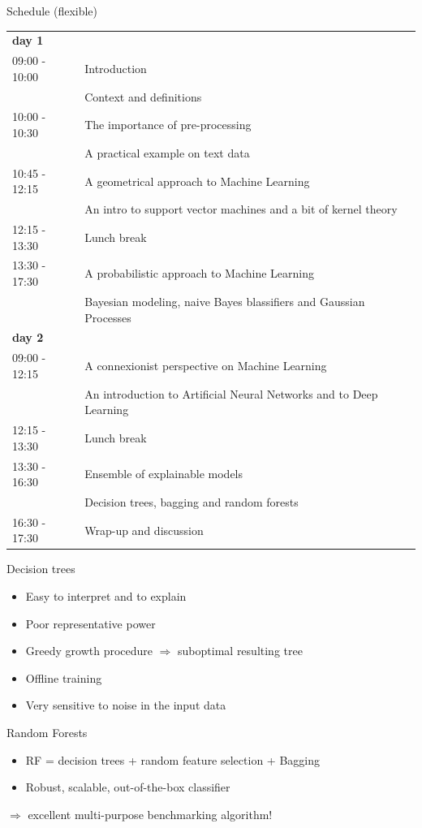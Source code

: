 \documentclass[10pt,a4paper,t,aspectratio=1610,dvipsnames]{beamer}
\begin{document}
\begin{frame}{Schedule (flexible)}
	\begin{tabular}{ll}
		\textbf{day 1} & \\
		09:00 - 10:00 & Introduction\\
		& {\footnotesize Context and definitions}\\
		10:00 - 10:30 & The importance of pre-processing\\
		& {\footnotesize A practical example on text data}\\
		10:45 - 12:15 & A geometrical approach to Machine Learning\\
		& {\footnotesize An intro to support vector machines and a bit of kernel theory}\\
		12:15 - 13:30 & Lunch break\\
		13:30 - 17:30 & A probabilistic approach to Machine Learning\\
		& {\footnotesize Bayesian modeling, naive Bayes blassifiers and Gaussian Processes}\\
		\hline
		\textbf{day 2}&\\
		09:00 - 12:15 & A connexionist perspective on Machine Learning\\
		& {\footnotesize An introduction to Artificial Neural Networks and to Deep Learning}\\
		12:15 - 13:30 & Lunch break\\
		13:30 - 16:30 & Ensemble of explainable models\\
		& {\footnotesize Decision trees, bagging and random forests}\\
		16:30 - 17:30 & Wrap-up and discussion
	\end{tabular}
\end{frame}

\begin{frame}{Decision trees}
	\begin{itemize}
		\item Easy to interpret and to explain
		\item Poor representative power
		\item Greedy growth procedure $\Rightarrow$ suboptimal resulting tree
		\item Offline training
		\item Very sensitive to noise in the input data
	\end{itemize}
\end{frame}

\begin{frame}{Random Forests}
	\begin{itemize}
		\item RF = decision trees + random feature selection + Bagging
		\item Robust, scalable, out-of-the-box classifier
	\end{itemize}
	$\Rightarrow$ excellent multi-purpose benchmarking algorithm!
\end{frame}
\end{document}
